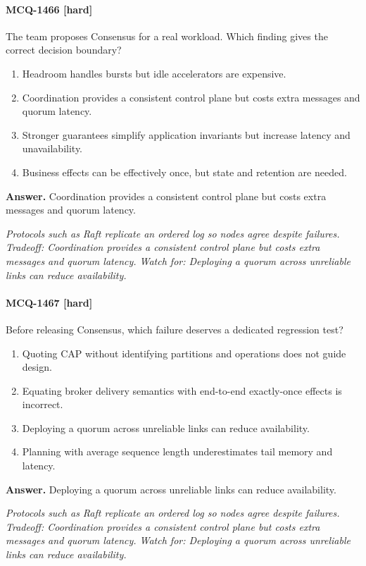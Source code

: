 \paragraph{MCQ-1466 [hard]} The team proposes Consensus for a real workload. Which finding gives the correct decision boundary?
\begin{enumerate}[label=\Alph*.]
\item Headroom handles bursts but idle accelerators are expensive.
\item Coordination provides a consistent control plane but costs extra messages and quorum latency.
\item Stronger guarantees simplify application invariants but increase latency and unavailability.
\item Business effects can be effectively once, but state and retention are needed.
\end{enumerate}
\noindent\textbf{Answer.} Coordination provides a consistent control plane but costs extra messages and quorum latency.
\par\textit{Protocols such as Raft replicate an ordered log so nodes agree despite failures. Tradeoff: Coordination provides a consistent control plane but costs extra messages and quorum latency. Watch for: Deploying a quorum across unreliable links can reduce availability.}
\paragraph{MCQ-1467 [hard]} Before releasing Consensus, which failure deserves a dedicated regression test?
\begin{enumerate}[label=\Alph*.]
\item Quoting CAP without identifying partitions and operations does not guide design.
\item Equating broker delivery semantics with end-to-end exactly-once effects is incorrect.
\item Deploying a quorum across unreliable links can reduce availability.
\item Planning with average sequence length underestimates tail memory and latency.
\end{enumerate}
\noindent\textbf{Answer.} Deploying a quorum across unreliable links can reduce availability.
\par\textit{Protocols such as Raft replicate an ordered log so nodes agree despite failures. Tradeoff: Coordination provides a consistent control plane but costs extra messages and quorum latency. Watch for: Deploying a quorum across unreliable links can reduce availability.}
